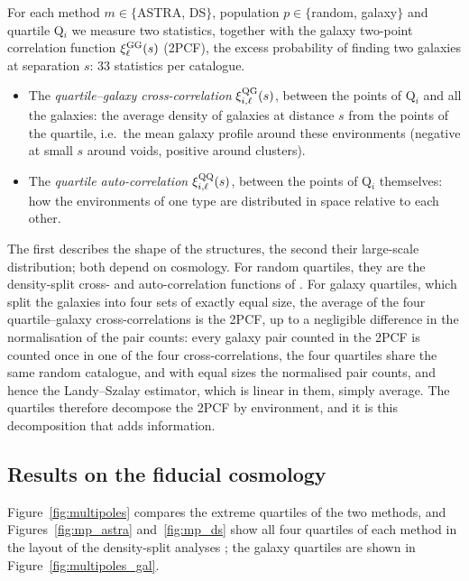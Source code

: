 For each method $m\in\{$ASTRA, DS$\}$, population $p\in\{$random, galaxy$\}$ and quartile Q$_i$ we measure two statistics, together with the galaxy two-point correlation function $\xi^{\rm GG}_\ell(s)$ (2PCF), the excess probability of finding two galaxies at separation $s$: 33 statistics per catalogue.
\begin{itemize}
\item The \emph{quartile--galaxy cross-correlation} $\xi^{\rm QG}_{i,\ell}(s)$, between the points of Q$_i$ and all the galaxies: the average density of galaxies at distance $s$ from the points of the quartile, i.e.\ the mean galaxy profile around these environments (negative at small $s$ around voids, positive around clusters).
\item The \emph{quartile auto-correlation} $\xi^{\rm QQ}_{i,\ell}(s)$, between the points of Q$_i$ themselves: how the environments of one type are distributed in space relative to each other.
\end{itemize}
The first describes the shape of the structures, the second their large-scale distribution; both depend on cosmology. For random quartiles, they are the density-split cross- and auto-correlation functions of \cite{Paillas2023}. For galaxy quartiles, which split the galaxies into four sets of exactly equal size, the average of the four quartile--galaxy cross-correlations is the 2PCF, up to a negligible difference in the normalisation of the pair counts: every galaxy pair counted in the 2PCF is counted once in one of the four cross-correlations, the four quartiles share the same random catalogue, and with equal sizes the normalised pair counts, and hence the Landy--Szalay estimator, which is linear in them, simply average. The quartiles therefore decompose the 2PCF by environment, and it is this decomposition that adds information.

\subsection{Results on the fiducial cosmology}

Figure~\ref{fig:multipoles} compares the extreme quartiles of the two methods, and Figures~\ref{fig:mp_astra} and~\ref{fig:mp_ds} show all four quartiles of each method in the layout of the density-split analyses \cite{Paillas2023}; the galaxy quartiles are shown in Figure~\ref{fig:multipoles_gal}.


